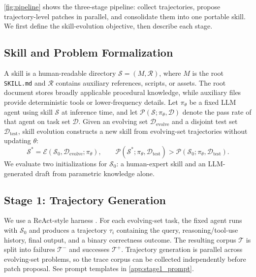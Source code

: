 \section{\systemname}
\label{sec:method}

\cref{fig:pipeline} shows the three-stage \systemname{} pipeline: collect trajectories, propose trajectory-level patches in parallel, and consolidate them into one portable skill.
We first define the skill-evolution objective, then describe each stage.

\subsection{Skill and Problem Formalization}
\label{sec:method:skill}

A skill is a human-readable directory $\mathcal{S}=(M,\mathcal{R})$, where $M$ is the root \texttt{SKILL.md} and $\mathcal{R}$ contains auxiliary references, scripts, or assets.
The root document stores broadly applicable procedural knowledge, while auxiliary files provide deterministic tools or lower-frequency details.
Let $\pi_\theta$ be a fixed LLM agent using skill $\mathcal{S}$ at inference time, and let $\mathcal{P}(\mathcal{S};\pi_\theta,\mathcal{D})$ denote the pass rate of that agent on task set $\mathcal{D}$.
Given an evolving set $\mathcal{D}_\text{evolve}$ and a disjoint test set $\mathcal{D}_\text{test}$, skill evolution constructs a new skill from evolving-set trajectories without updating $\theta$:
\begin{equation}
    \mathcal{S}^* = \mathcal{E}(\mathcal{S}_0,\mathcal{D}_\text{evolve};\pi_\theta),
    \qquad
    \mathcal{P}(\mathcal{S}^*;\pi_\theta,\mathcal{D}_\text{test})
    > \mathcal{P}(\mathcal{S}_0;\pi_\theta,\mathcal{D}_\text{test}).
\end{equation}
We evaluate two initializations for $\mathcal{S}_0$: a human-expert skill and an LLM-generated draft from parametric knowledge alone.

\subsection{Stage 1: Trajectory Generation}
\label{sec:method:trajectories}

We use a ReAct-style harness \citep{yao2023reactsynergizingreasoningacting}.
For each evolving-set task, the fixed agent runs with $\mathcal{S}_0$ and produces a trajectory $\tau_i$ containing the query, reasoning/tool-use history, final output, and a binary correctness outcome.
The resulting corpus $\mathcal{T}$ is split into failures $\mathcal{T}^-$ and successes $\mathcal{T}^+$.
Trajectory generation is parallel across evolving-set problems, so the trace corpus can be collected independently before patch proposal.
See prompt templates in \cref{app:stage1_prompt}.

